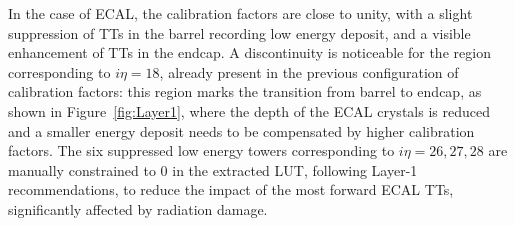 \begin{figure}
    \centering
    \caption{}
    \label{fig:HCALSFs_NN}
\end{figure}

\begin{figure}
    \centering
    \caption{}
    \label{fig:HFSFs_NN}
\end{figure}

In the case of ECAL, the calibration factors are close to unity, with a slight suppression of TTs in the barrel recording low energy deposit, and a visible enhancement of TTs in the endcap. A discontinuity is noticeable for the region corresponding to $i\eta=18$, already present in the previous configuration of calibration factors: this region marks the transition from barrel to endcap, as shown in Figure~\ref{fig:Layer1}, where the depth of the ECAL crystals is reduced and a smaller energy deposit needs to be compensated by higher calibration factors. The six suppressed low energy towers corresponding to $i\eta=26,27,28$ are manually constrained to 0 in the extracted LUT, following Layer-1 recommendations, to reduce the impact of the most forward ECAL TTs, significantly affected by radiation damage.


